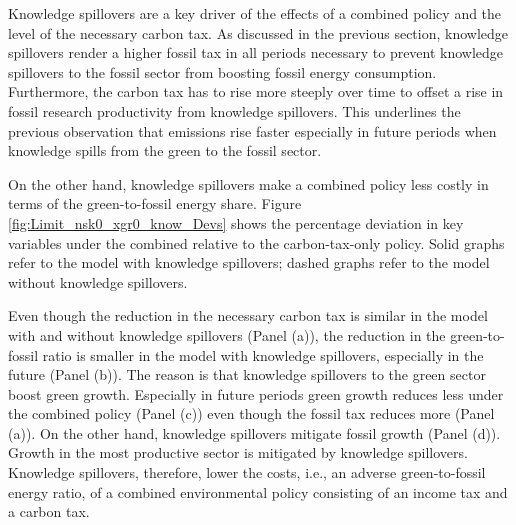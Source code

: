 Knowledge spillovers are a key driver of the effects of a combined policy and the level of the necessary carbon tax.
As discussed in the previous section, knowledge spillovers render a higher fossil tax in all periods necessary to prevent knowledge spillovers to the fossil  sector from boosting fossil energy consumption. Furthermore, the carbon tax has to rise more steeply over time to offset a rise in fossil research productivity from knowledge spillovers. 
This underlines the previous observation that emissions rise faster especially in future periods when knowledge spills from the green to the fossil sector. 

On the other hand, knowledge spillovers make a combined policy less costly in terms of the green-to-fossil energy share.
Figure \ref{fig:Limit_nsk0_xgr0_know_Devs} shows the percentage deviation in key variables under the combined relative to the carbon-tax-only policy. Solid graphs refer to the model with knowledge spillovers; dashed graphs refer to the model without knowledge spillovers. 

Even though the reduction in the necessary carbon tax is similar in the model with and without knowledge spillovers (Panel (a)), the reduction in the green-to-fossil ratio is smaller in the model with knowledge spillovers, especially in the future (Panel (b)). The reason is that knowledge spillovers to the green sector boost green growth. Especially in future periods green growth reduces less under the combined policy (Panel (c)) even though the fossil tax reduces more (Panel (a)). On the other hand, knowledge spillovers mitigate fossil growth (Panel (d)).  Growth in the most productive sector is mitigated by knowledge spillovers.  Knowledge spillovers, therefore, lower the costs, i.e., an adverse green-to-fossil energy ratio, of a combined environmental policy consisting of an income tax and a carbon tax. 


 

